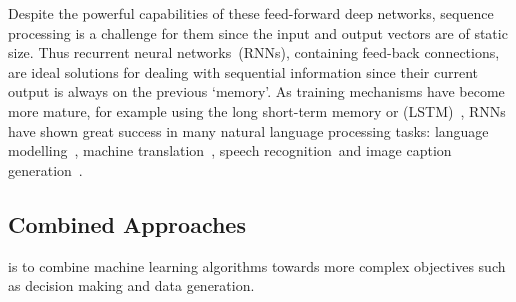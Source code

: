 Despite the powerful capabilities of these feed-forward deep networks, sequence processing is a challenge for them since the input and output vectors are of static size.
Thus recurrent neural networks~(RNNs), containing feed-back connections, are ideal solutions for dealing with sequential information since their current output is always \DIFdelbegin {}\DIFdelend \DIFaddbegin {}\DIFaddend on the previous `memory'.
As training mechanisms have become more mature, for example using the long short-term memory or (LSTM)~\DIFdelbegin {}\DIFdelend \DIFaddbegin {}\DIFaddend , RNNs have shown great success in many natural language processing tasks: language modelling~\DIFdelbegin {}\DIFdelend \DIFaddbegin {}\DIFaddend , machine translation~\DIFdelbegin {}\DIFdelend \DIFaddbegin {}\DIFaddend , speech recognition~\DIFdelbegin {}\DIFdelend \DIFaddbegin {}\DIFaddend and image caption generation~\DIFdelbegin {}\DIFdelend \DIFaddbegin {}\DIFaddend .

\subsection{Combined Approaches}
\DIFdelbegin {}\DIFdelend \DIFaddbegin {}\DIFaddend is to combine machine learning algorithms towards more complex objectives \DIFdelbegin \DIFdel{: }\DIFdelend such as decision making and data generation.

